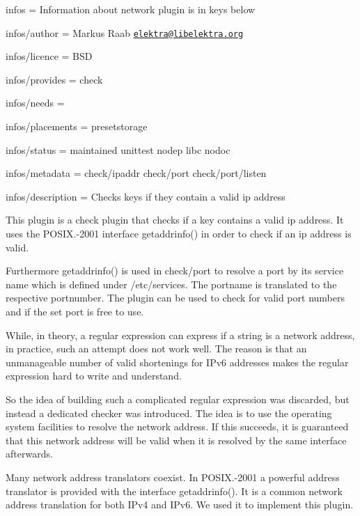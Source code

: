 
\begin{DoxyItemize}
\item infos = Information about network plugin is in keys below
\item infos/author = Markus Raab \href{mailto:elektra@libelektra.org}{\tt elektra@libelektra.\+org}
\item infos/licence = B\+SD
\item infos/provides = check
\item infos/needs =
\item infos/placements = presetstorage
\item infos/status = maintained unittest nodep libc nodoc
\item infos/metadata = check/ipaddr check/port check/port/listen
\item infos/description = Checks keys if they contain a valid ip address
\end{DoxyItemize}

This plugin is a check plugin that checks if a key contains a valid ip address. It uses the {\ttfamily P\+O\+S\+I\+X.-\/2001} interface {\ttfamily getaddrinfo()} in order to check if an ip address is valid.

Furthermore {\ttfamily getaddrinfo()} is used in {\ttfamily check/port} to resolve a port by its service name which is defined under {\ttfamily /etc/services}. The portname is translated to the respective portnumber. The plugin can be used to check for valid port numbers and if the set port is free to use.

While, in theory, a regular expression can express if a string is a network address, in practice, such an attempt does not work well. The reason is that an unmanageable number of valid shortenings for I\+Pv6 addresses makes the regular expression hard to write and understand.

So the idea of building such a complicated regular expression was discarded, but instead a dedicated checker was introduced. The idea is to use the operating system facilities to resolve the network address. If this succeeds, it is guaranteed that this network address will be valid when it is resolved by the same interface afterwards.

Many network address translators coexist. In {\ttfamily P\+O\+S\+I\+X.-\/2001} a powerful address translator is provided with the interface {\ttfamily getaddrinfo()}. It is a common network address translation for both I\+Pv4 and I\+Pv6. We used it to implement this plugin.

